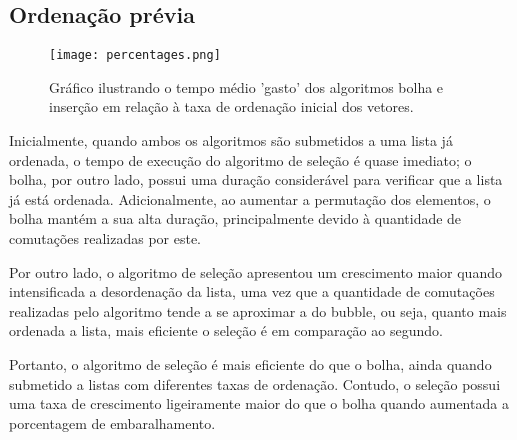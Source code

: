 \subsection{Ordenação prévia}
\begin{figure}[h]
    \texttt{[image: percentages.png]}
    \caption{Gráfico ilustrando o tempo médio 'gasto' dos algoritmos bolha e inserção em relação à taxa de ordenação inicial dos vetores.}
\end{figure}
Inicialmente, quando ambos os algoritmos são submetidos a uma lista já ordenada, o tempo de execução do algoritmo de seleção é quase imediato; o bolha, por outro lado, possui uma duração considerável para verificar que a lista já está ordenada. Adicionalmente, ao aumentar a permutação dos elementos, o bolha mantém a sua alta duração, principalmente devido à quantidade de comutações realizadas por este.

Por outro lado, o algoritmo de seleção apresentou um crescimento maior quando intensificada a desordenação da lista, uma vez que a quantidade de comutações realizadas pelo algoritmo tende a se aproximar a do bubble, ou seja, quanto mais ordenada a lista, mais eficiente o seleção é em comparação ao segundo.

Portanto, o algoritmo de seleção é mais eficiente do que o bolha, ainda quando submetido a listas com diferentes taxas de ordenação. Contudo, o seleção possui uma taxa de crescimento ligeiramente maior do que o bolha quando aumentada a porcentagem de embaralhamento.
